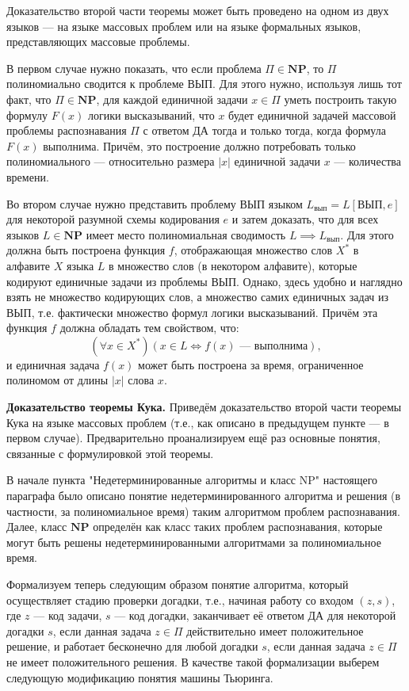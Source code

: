 \documentclass[a4paper,12pt]{article}
\begin{document}
Доказательство второй части теоремы может быть проведено на одном из двух языков --- на языке массовых проблем или на языке формальных языков, представляющих массовые проблемы.

В первом случае нужно показать, что если проблема \(\Pi \in \mathbf{NP}\), то \(\Pi\) полиномиально сводится к проблеме ВЫП. Для этого нужно, используя лишь тот факт, что \(\Pi \in \mathbf{NP}\), для каждой единичной задачи \(x \in \Pi\) уметь построить такую формулу \(F(x)\) логики высказываний, что \(x\) будет единичной задачей массовой проблемы распознавания \(\Pi\) с ответом ДА тогда и только тогда, когда формула \(F(x)\) выполнима. Причём, это построение должно потребовать только полиномиального --- относительно размера \(|x|\) единичной задачи \(x\) --- количества времени.

Во втором случае нужно представить проблему ВЫП языком \(L_{\text{вып}} = L[\text{ВЫП}, e]\) для некоторой разумной схемы кодирования \(e\) и затем доказать, что для всех языков \(L \in \mathbf{NP}\) имеет место полиномиальная сводимость \(L \implies L_{\text{вып}}\). Для этого должна быть построена функция \(f\), отображающая множество слов \(X^*\) в алфавите \(X\) языка \(L\) в множество слов (в некотором алфавите), которые кодируют единичные задачи из проблемы ВЫП. Однако, здесь удобно и наглядно взять не множество кодирующих слов, а множество самих единичных задач из ВЫП, т.е. фактически множество формул логики высказываний. Причём эта функция \(f\) должна обладать тем свойством, что:
\[
(\forall x \in X^*)(x \in L \iff f(x) \text{ --- выполнима}),
\]
и единичная задача \(f(x)\) может быть построена за время, ограниченное полиномом от длины \(|x|\) слова \(x\).

\textbf{Доказательство теоремы Кука.} Приведём доказательство второй части теоремы Кука на языке массовых проблем (т.е., как описано в предыдущем пункте --- в первом случае). Предварительно проанализируем ещё раз основные понятия, связанные с формулировкой этой теоремы.

В начале пункта "Недетерминированные алгоритмы и класс NP" настоящего параграфа было описано понятие недетерминированного алгоритма и решения (в частности, за полиномиальное время) таким алгоритмом проблем распознавания. Далее, класс \(\mathbf{NP}\) определён как класс таких проблем распознавания, которые могут быть решены недетерминированными алгоритмами за полиномиальное время.

Формализуем теперь следующим образом понятие алгоритма, который осуществляет стадию проверки догадки, т.е., начиная работу со входом \((z, s)\), где \(z\) --- код задачи, \(s\) --- код догадки, заканчивает её ответом ДА для некоторой догадки \(s\), если данная задача \(z \in \Pi\) действительно имеет положительное решение, и работает бесконечно для любой догадки \(s\), если данная задача \(z \in \Pi\) не имеет положительного решения. В качестве такой формализации выберем следующую модификацию понятия машины Тьюринга.
\end{document}
